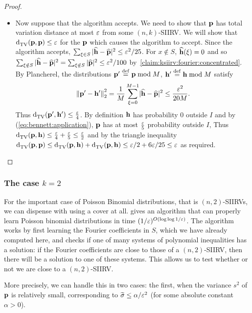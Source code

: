 \begin{proof}
\begin{itemize}
  \item Now suppose that the algorithm accepts. We need to show that $\mathbf{p}$ has total variation distance at most $\varepsilon$ from some $(n,k)$-SIIRV. We will show that $ {\operatorname{d}_{\textrm{TV}}^{}\!\left({\mathbf{p}, \mathbf{p}}\right)} \leq \varepsilon$ for the $\mathbf{p}$ which causes the algorithm to accept.  Since the algorithm accepts, $\sum_{\xi \in S} |\widehat{\mathbf{h}}-\widehat{\mathbf{p}}|^2 \leq \varepsilon^2/25$. 
For $x \notin S$, $\widehat{\mathbf{h}}(\xi)=0$ and so $\sum_{\xi \notin S} |\widehat{\mathbf{h}}-\widehat{\mathbf{p}}|^2 = \sum_{\xi \notin S} |\widehat{\mathbf{p}}|^2 \leq \varepsilon^2/100$ by~\cref{claim:ksiirv:fourier:concentrated}. By Plancherel, the distributions $\mathbf{p}'\stackrel{\rm def}{=} \mathbf{p} \bmod M$, $\mathbf{h}'\stackrel{\rm def}{=} \mathbf{h} \bmod M$ satisfy 
\[
  {\lVert \mathbf{p}'-\mathbf{h}'{\rVert}}_2^2 = \frac{1}{M}\sum_{\xi=0}^{M-1} \lvert  \widehat{\mathbf{h}}-\widehat{\mathbf{p}}  \rvert^2 \leq \frac{\varepsilon^2}{20M}.
\] Thus ${\operatorname{d}_{\textrm{TV}}^{}\!\left({\mathbf{p}', \mathbf{h}'}\right)} \leq \frac{\varepsilon}{4}$. By definition $\mathbf{h}$ has probability $0$ outside $I$ and by (\ref{eq:bennett:application}), $\mathbf{p}$ has at most $\frac{\varepsilon}{5}$ probability outside $I$, Thus ${\operatorname{d}_{\textrm{TV}}^{}\!\left({\mathbf{p}, \mathbf{h}}\right)} \leq \frac{\varepsilon}{4}+\frac{\varepsilon}{5} \leq \frac{\varepsilon}{2}$ and by the triangle inequality $ {\operatorname{d}_{\textrm{TV}}^{}\!\left({\mathbf{p}, \mathbf{p}}\right)} \leq {\operatorname{d}_{\textrm{TV}}^{}\!\left({\ensuremath{\mathbf{p}}, \ensuremath{\mathbf{h}}}\right)} +  {\operatorname{d}_{\textrm{TV}}^{}\!\left({\mathbf{p}, \mathbf{h}}\right)} \leq \varepsilon/2 + 6\varepsilon/25 \leq \varepsilon$ as required.
\end{itemize}
\end{proof}

\subsubsection{The case $k=2$}
For the important case of Poisson Binomial distributions, that is $(n,2)$-SIIRVs, we can dispense with using a cover at all. \cite{DKS:15b} gives an algorithm that can properly learn Poisson binomial distributions in time $(1/\varepsilon)^{O(\log \log 1/\varepsilon)}$. The algorithm works by first learning the Fourier coefficients in $S$, which we have already computed here, and checks if one of many systems of polynomial inequalities has a solution: if the Fourier coefficients are close to those of a $(n,2)$-SIIRV, then there will be a solution to one of these systems. This allows us to test whether or not we are close to a $(n,2)$-SIIRV.

More precisely, we can handle this in two cases: the first, when the variance $s^2$ of $\mathbf{p}$ is relatively small, corresponding to $\widetilde{\sigma} \leq \alpha/\varepsilon^2$ (for some absolute constant $\alpha >0$).

